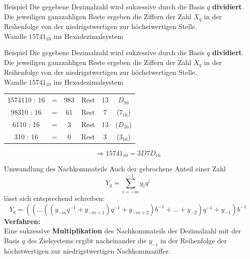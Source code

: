 \documentclass[12pt%
,aspectratio=169%
]{beamer}
\begin{document}
\begin{frame}{Beispiel}
Die gegebene Dezimalzahl wird sukzessive durch die Basis $q$ \textbf{dividiert}.\\
Die jeweiligen ganzzahligen Reste ergeben die Ziffern der Zahl $X_q$ in der Reihenfolge von der niedrigstwertigen zur höchstwertigen Stelle.\\
Wandle $15741_{10}$ ins Hexadezimalsystem
\end{frame}

\begin{frame}{Beispiel}
Die gegebene Dezimalzahl wird sukzessive durch die Basis $q$ \textbf{dividiert}.\\
Die jeweiligen ganzzahligen Reste ergeben die Ziffern der Zahl $X_q$ in der Reihenfolge von der niedrigstwertigen zur höchstwertigen Stelle.\\
Wandle $15741_{10}$ ins Hexadezimalsystem
\begin{table}[h]
\begin{tabular}{cccccc}
1574110 : 16 & = & 983 & Rest & 13 & $D_{16}$ \\ 
98310 : 16 & = & 61 & Rest & 7 & ($7_{16}$) \\
6110 : 16 & = &  3 & Rest & 13 & ($D_{16}$) \\
310 : 16 & = & 0 & Rest & 3 & ($3_{16}$)
\end{tabular}
\end{table}
\begin{center}
	$$ \Rightarrow 15741_{10} = 3D7D_{16}$$
\end{center}
\end{frame}

\begin{frame}{Umwandlung des Nachkommateils}
Auch der gebrochene Anteil einer Zahl $$Y_q = \sum_{i=-m}^{-1} y_i q^i$$ lässt sich entsprechend schreiben:
$$
	Y_q = ((\ldots ((y_{-m} q^{-1} + y_{-m+1}) q^{-1} + y_{-m+2}) b^{-1} + \ldots +y_{-2}) q^{-1} + y_{-1}) b^{-1}
$$
\textbf{Verfahren:}\\
Eine sukzessive \textbf{Multiplikation} des Nachkommateils der Dezimalzahl mit der Basis $q$ des Zielsystems ergibt nacheinander die $y_{-i}$ in der Reihenfolge der höchstwertigen zur niedrigstwertigen Nachkommaziffer.
\end{frame}
\end{document}
